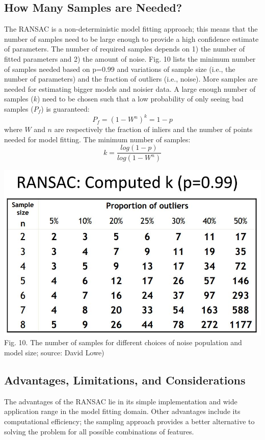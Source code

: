 \documentclass{article}
\begin{document}
\subsection{How Many Samples are Needed?}
The RANSAC is a non-deterministic model fitting approach; this means that the number of samples need to be large enough to provide a high confidence estimate of parameters. The number of required samples depends on 1) the number of fitted parameters and 2) the amount of noise. Fig. 10 lists the minimum number of samples needed based on p=0.99 and variations of sample size (i.e., the number of parameters) and the fraction of outliers (i.e., noise). More samples are needed for estimating bigger models and noisier data.
A large enough number of samples ($k$) need to be chosen such that a low probability of only seeing bad samples (${P_f}$) is guaranteed:
$${P_f}= (1-W^n)^k= 1-p$$
where $W$ and $n$ are respectively the fraction of inliers and the number of points needed for model fitting. The minimum number of samples:
$$k=\frac{log(1-p)}{log(1-W^n)}$$

\includegraphics[width=\textwidth]{ransac4.png}
Fig. 10. The number of samples for different choices of noise population and model size; source: David Lowe)

\subsection{Advantages, Limitations, and Considerations}
The advantages of the RANSAC lie in its simple implementation and wide application range in the model fitting domain. Other advantages include its computational efficiency; the sampling approach provides a better alternative to solving the problem for all possible combinations of features.
\end{document}

